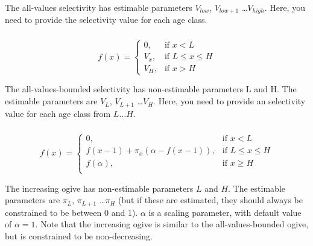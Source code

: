 The all-values selectivity has estimable parameters $V_{low}$, $V_{low+1}$ \ldots $V_{high}$. Here, you need to provide the selectivity value for each age class.

\subsubsection[All-values-bounded]{}

\begin{equation}
f(x)=\begin{cases}
		 0, & \text{if $x < L$} \\
		 V_x, & \text{if $L \le x \le H$} \\
		 V_H, & \text{if $x > H$}
  \end{cases}
\end{equation}

The all-values-bounded selectivity has non-estimable parameters L and H. The estimable parameters are $V_L$, $V_{L+1}$ \ldots $V_H$. Here, you need to provide an selectivity value for each age class from $L \ldots H$.

\subsubsection[Increasing]{}

\begin{equation} 
f(x)=\begin{cases}
	  0, & \text{if $x < L$} \\
	  f(x-1)+ \pi_x(\alpha-f(x-1)), & \text{if $L \le x \le H$} \\
	  f(\alpha), & \text{if $x \ge H$} \\  
  \end{cases}
\end{equation}

The increasing ogive has non-estimable parameters $L$ and $H$. The estimable parameters are $\pi_L$, $\pi_{L+1}$ \ldots $\pi_H$ (but if these are estimated, they should always be constrained to be between 0 and 1). $\alpha$ is a scaling parameter, with default value of $\alpha = 1$. Note that the increasing ogive is similar to the all-values-bounded ogive, but is constrained to be non-decreasing.

\subsubsection[Logistic]{}

